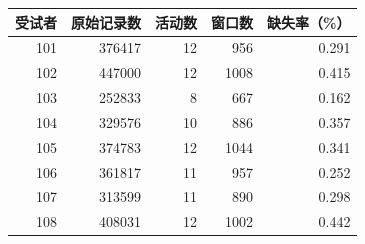 \begin{tabular}{rrrrr}
\toprule
受试者 & 原始记录数 & 活动数 & 窗口数 & 缺失率（\%） \\
\midrule
101 & 376417 & 12 & 956 & 0.291 \\
102 & 447000 & 12 & 1008 & 0.415 \\
103 & 252833 & 8 & 667 & 0.162 \\
104 & 329576 & 10 & 886 & 0.357 \\
105 & 374783 & 12 & 1044 & 0.341 \\
106 & 361817 & 11 & 957 & 0.252 \\
107 & 313599 & 11 & 890 & 0.298 \\
108 & 408031 & 12 & 1002 & 0.442 \\
\bottomrule
\end{tabular}
